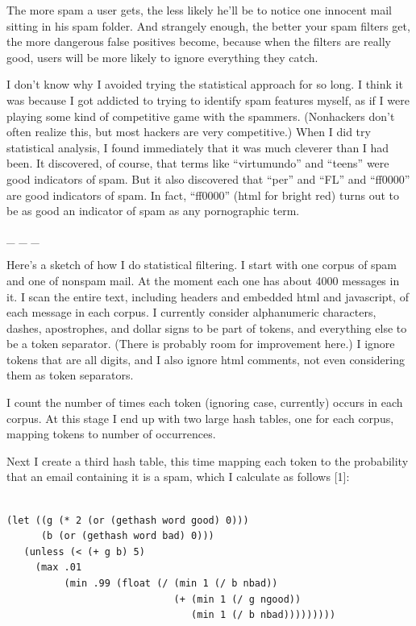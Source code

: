 The more spam a user gets, the less likely he'll be to notice one
innocent mail sitting in his spam folder. And strangely enough, the
better your spam filters get, the more dangerous false positives become,
because when the filters are really good, users will be more likely to
ignore everything they catch.

I don't know why I avoided trying the statistical approach for so long.
I think it was because I got addicted to trying to identify spam
features myself, as if I were playing some kind of competitive game with
the spammers. (Nonhackers don't often realize this, but most hackers are
very competitive.) When I did try statistical analysis, I found
immediately that it was much cleverer than I had been. It discovered, of
course, that terms like ``virtumundo'' and ``teens'' were good
indicators of spam. But it also discovered that ``per'' and ``FL'' and
``ff0000'' are good indicators of spam. In fact, ``ff0000'' (html for
bright red) turns out to be as good an indicator of spam as any
pornographic term.

\_ \_ \_

Here's a sketch of how I do statistical filtering. I start with one
corpus of spam and one of nonspam mail. At the moment each one has about
4000 messages in it. I scan the entire text, including headers and
embedded html and javascript, of each message in each corpus. I
currently consider alphanumeric characters, dashes, apostrophes, and
dollar signs to be part of tokens, and everything else to be a token
separator. (There is probably room for improvement here.) I ignore
tokens that are all digits, and I also ignore html comments, not even
considering them as token separators.

I count the number of times each token (ignoring case, currently) occurs
in each corpus. At this stage I end up with two large hash tables, one
for each corpus, mapping tokens to number of occurrences.

Next I create a third hash table, this time mapping each token to the
probability that an email containing it is a spam, which I calculate as
follows {[}1{]}:

\begin{verbatim}

(let ((g (* 2 (or (gethash word good) 0)))
      (b (or (gethash word bad) 0)))
   (unless (< (+ g b) 5)
     (max .01
          (min .99 (float (/ (min 1 (/ b nbad))
                             (+ (min 1 (/ g ngood))   
                                (min 1 (/ b nbad)))))))))
\end{verbatim}

